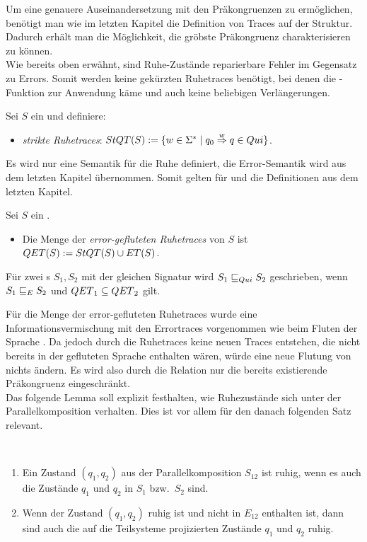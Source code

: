 Um eine genauere Auseinandersetzung mit den Präkongruenzen zu ermöglichen,
benötigt man wie im letzten Kapitel die Definition von Traces auf der Struktur.
Dadurch erhält man die Möglichkeit, die gröbste Präkongruenz charakterisieren zu
können.\\
Wie bereits oben erwähnt, sind Ruhe-Zustände reparierbare Fehler im Gegensatz
zu Errors. Somit werden keine gekürzten Ruhetraces benötigt, bei denen die
\prune{}-Funktion zur Anwendung käme und auch keine beliebigen Verlängerungen.

\begin{Def}[Ruhetraces]
\label{DefRuhetraces}
  Sei $S$ ein \EIO{} und definiere:
  \begin{itemize}
    \item \emph{strikte Ruhetraces}: $StQT{}(S) := \{w\in\Sigma ^*\mid q_0
      \overset{w}{\Rightarrow} q\in Qui\}$.
  \end{itemize}
\end{Def}

Es wird nur eine Semantik für die Ruhe definiert, die Error-Semantik wird aus
dem letzten Kapitel übernommen. Somit gelten für \ET{} und \EL{} die
Definitionen aus dem letzten Kapitel.

\begin{Def}
\label{DefQTQL}
  Sei $S$ ein \EIO{}.
  \begin{itemize}
    \item Die Menge der \emph{error-gefluteten Ruhetraces} von $S$ ist
      $QET{}(S) := StQT{}(S)\cup ET{}(S)$.
  \end{itemize}
  Für zwei \EIO{}s $S_1, S_2$ mit der gleichen Signatur wird
  $S_1\sqsubseteq _{Qui} S_2$ geschrieben, wenn $S_1\sqsubseteq _E S_2$ und $QET{}_1\subseteq
  QET{}_2$ gilt.
\end{Def}

Für die Menge der error-gefluteten Ruhetraces \QT{} wurde eine Informationsvermischung
mit den Errortraces vorgenommen wie beim Fluten der Sprache \EL{}. Da jedoch
durch die Ruhetraces keine neuen Traces entstehen, die nicht bereits in der
gefluteten Sprache \EL{} enthalten wären, würde eine neue Flutung von \EL{}
nichts ändern. Es wird also durch die Relation \QRel{} nur die
bereits existierende Präkongruenz \ERel{} eingeschränkt.\\
Das folgende Lemma soll explizit festhalten, wie Ruhezustände sich unter der
Parallelkomposition verhalten. Dies ist vor allem für den danach folgenden Satz
relevant.

\begin{lem}
\label{lemRuheParallelkomp}
  ~
  \begin{enumerate}
    \item Ein Zustand $(q_1,q_2)$ aus der Parallelkomposition $S_{12}$
      ist ruhig, wenn es auch die Zustände $q_1$ und $q_2$ in $S_1$ bzw.\ $S_2$
      sind.
    \item Wenn der Zustand $(q_1,q_2)$ ruhig ist und nicht in $E_{12}$
      enthalten ist, dann sind auch die auf die Teilsysteme projizierten
      Zustände $q_1$ und $q_2$ ruhig.
  \end{enumerate}
\end{lem}

